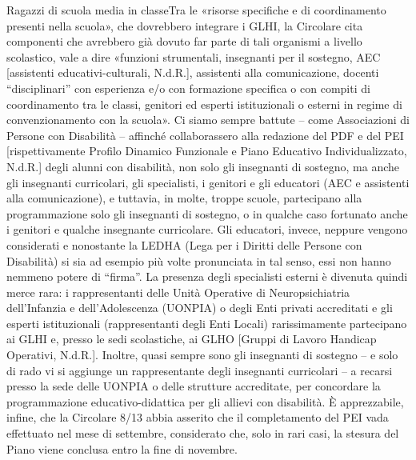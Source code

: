 Ragazzi di scuola media in classeTra le «risorse specifiche e di coordinamento presenti nella scuola», che dovrebbero integrare i GLHI, la Circolare cita componenti che avrebbero già dovuto far parte di tali organismi a livello scolastico, vale a dire «funzioni strumentali, insegnanti per il sostegno, AEC [assistenti educativi-culturali, N.d.R.], assistenti alla comunicazione, docenti “disciplinari” con esperienza e/o con formazione specifica o con compiti di coordinamento tra le classi, genitori ed esperti istituzionali o esterni in regime di convenzionamento con la scuola».
Ci siamo sempre battute – come Associazioni di Persone con Disabilità – affinché collaborassero alla redazione del PDF e del PEI [rispettivamente Profilo Dinamico Funzionale e Piano Educativo Individualizzato, N.d.R.] degli alunni con disabilità, non solo gli insegnanti di sostegno, ma anche gli insegnanti curricolari, gli specialisti, i genitori e gli educatori (AEC e assistenti alla comunicazione), e tuttavia, in molte, troppe scuole, partecipano alla programmazione solo gli insegnanti di sostegno, o in qualche caso fortunato anche i genitori e qualche insegnante curricolare. Gli educatori, invece, neppure vengono considerati e nonostante la LEDHA (Lega per i Diritti delle Persone con Disabilità) si sia ad esempio più volte pronunciata in tal senso, essi non hanno nemmeno potere di “firma”.
La presenza degli specialisti esterni è divenuta quindi merce rara: i rappresentanti delle Unità Operative di Neuropsichiatria dell’Infanzia e dell’Adolescenza (UONPIA) o degli Enti privati accreditati e gli esperti istituzionali (rappresentanti degli Enti Locali) rarissimamente partecipano ai GLHI e, presso le sedi scolastiche, ai GLHO [Gruppi di Lavoro Handicap Operativi, N.d.R.]. Inoltre, quasi sempre sono gli insegnanti di sostegno – e solo di rado vi si aggiunge un rappresentante degli insegnanti curricolari – a recarsi presso la sede delle UONPIA o delle strutture accreditate, per concordare la programmazione educativo-didattica per gli allievi con disabilità.
È apprezzabile, infine, che la Circolare 8/13 abbia asserito che il completamento del PEI vada effettuato nel mese di settembre, considerato che, solo in rari casi, la stesura del Piano viene conclusa entro la fine di novembre.

